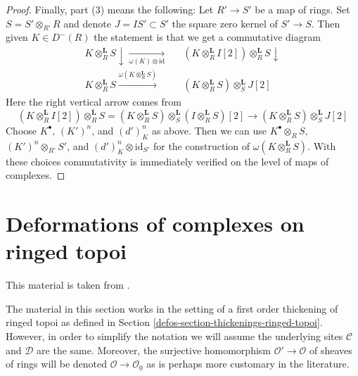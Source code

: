 \begin{proof}
\medskip\noindent
Finally, part (3) means the following: Let $R' \to S'$ be a map of
rings. Set $S = S' \otimes_{R'} R$ and denote $J = IS' \subset S'$
the square zero kernel of $S' \to S$. Then given $K \in D^-(R)$
the statement is that we get a commutative diagram
$$
\begin{array}{ccc}K \otimes_R^\mathbf{L} S \downarrow\underset{\omega(K) \otimes \text{id}}{\longrightarrow} &  & (K \otimes^\mathbf{L}_R I[2]) \otimes_R^\mathbf{L} S \downarrow \\ K \otimes_R^\mathbf{L} S \overset{\omega(K \otimes_R^\mathbf{L} S)}{\longrightarrow} &  & (K \otimes_R^\mathbf{L} S) \otimes^\mathbf{L}_S J[2]\end{array}
$$
Here the right vertical arrow comes from
$$
(K \otimes^\mathbf{L}_R I[2]) \otimes_R^\mathbf{L} S =
(K \otimes_R^\mathbf{L} S) \otimes_S^\mathbf{L}
(I \otimes_R^\mathbf{L} S)[2] \longrightarrow
(K \otimes_R^\mathbf{L} S) \otimes_S^\mathbf{L} J[2]
$$
Choose $K^\bullet$, $(K')^n$, and $(d')^n_K$ as above.
Then we can use $K^\bullet \otimes_R S$, $(K')^n \otimes_{R'} S'$, and
$(d')^n_K \otimes \text{id}_{S'}$ for the construction of
$\omega(K \otimes_R^\mathbf{L} S)$.
With these choices commutativity
is immediately verified on the level of maps of complexes.
\end{proof}

\section{Deformations of complexes on ringed topoi}
\label{defos-section-thickenings-complexes}
This material is taken from \cite{lieblich-complexes}.

\medskip\noindent
The material in this section works in the setting of a first order thickening
of ringed topoi as defined in Section \ref{defos-section-thickenings-ringed-topoi}.
However, in order to simplify the notation we will assume the underlying
sites $\mathcal{C}$ and $\mathcal{D}$ are the same.
Moreover, the surjective homomorphism $\mathcal{O}' \to \mathcal{O}$
of sheaves of rings will be denoted $\mathcal{O} \to \mathcal{O}_0$
as is perhaps more customary in the literature.

